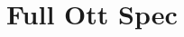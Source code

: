 \documentclass[11pt]{article}
\begin{document}
\appendix

\section{Full Ott Spec}
\label{sec:full_ott_spec}
\footnotesize
\ottall
\end{document}
